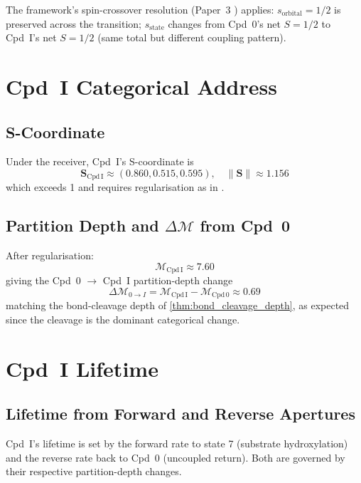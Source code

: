 \documentclass[11pt,twocolumn,a4paper]{article}
\theoremstyle{definition}
\theoremstyle{remark}
\newcommand{\Scoord}{\mathbf{S}}
\newcommand{\depth}{\mathcal{M}}
\newcommand{\CmpdI}{\mathrm{Cpd\,I}}
\newcommand{\CmpdZero}{\mathrm{Cpd\,0}}
\begin{document}
The framework's spin-crossover resolution (Paper~3 \citep{sachikonye2025_paper3})
applies: $s_{\mathrm{orbital}} = 1/2$ is preserved across the transition;
$s_{\mathrm{state}}$ changes from Cpd~0's net $S = 1/2$ to Cpd~I's net
$S = 1/2$ (same total but different coupling pattern).

\section{Cpd~I Categorical Address}
\label{sec:cpdI_address}

\subsection{S-Coordinate}

Under the receiver, Cpd~I's S-coordinate is
\begin{equation}
\Scoord_{\CmpdI} \approx (0.860, 0.515, 0.595),\quad \|\Scoord\| \approx 1.156
\end{equation}
which exceeds 1 and requires regularisation as in \citep{sachikonye2025_paper3}.

\subsection{Partition Depth and $\Delta\depth$ from Cpd~0}

After regularisation:
\begin{equation}
\depth_{\CmpdI} \approx 7.60
\end{equation}
giving the Cpd~0 $\to$ Cpd~I partition-depth change
\begin{equation}
\Delta\depth_{0 \to I} = \depth_{\CmpdI} - \depth_{\CmpdZero} \approx 0.69
\end{equation}
matching the bond-cleavage depth of \cref{thm:bond_cleavage_depth}, as
expected since the cleavage is the dominant categorical change.

\section{Cpd~I Lifetime}
\label{sec:cpdI_lifetime}

\subsection{Lifetime from Forward and Reverse Apertures}

Cpd~I's lifetime is set by the forward rate to state 7 (substrate
hydroxylation) and the reverse rate back to Cpd~0 (uncoupled return). Both
are governed by their respective partition-depth changes.
\end{document}
